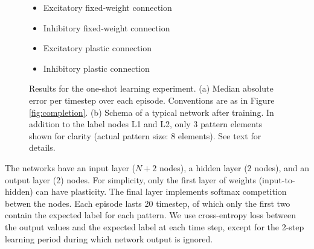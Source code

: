 \documentclass{article}
\begin{document}
\begin{figure}[b]
\begin{subfigure}[t]{0.4\textwidth}
\end{subfigure}
\begin{minipage}[b]{0.2\textwidth}
\noindent
\small
\begin{itemize}[leftmargin=*] %
\item[]\tikz{\path[very thick,->,draw=black] %
        (0,0) -- (1,0) ;}Excitatory fixed-weight connection
\item[]\tikz{\path[very thick,->,draw=blue] %
        (0,0) -- (1,0) ;}Inhibitory fixed-weight connection
\item[]\tikz{\path[very thick,->,dashed,draw=black] %
        (0,0) -- (1,0) ;}Excitatory plastic connection
\item[]\tikz{\path[very thick,->,dashed,draw=blue] %
        (0,0) -- (1,0) ;}Inhibitory plastic connection
\end{itemize}
\end{minipage}

\caption{Results for the one-shot learning experiment. (a) Median absolute error
    per timestep over each episode. Conventions are as in Figure
    \ref{fig:completion}.
(b) Schema of a
typical network after training. In addition to the label nodes L1 and L2, only 3 pattern elements shown for clarity (actual
pattern size: 8 elements). See text for details.}
\label{fig:oneshot}
\end{figure}

The networks have an input layer ($N+2$ nodes), a hidden layer (2 nodes), and an
output layer (2) nodes. For simplicity, only the first layer of weights
(input-to-hidden) can have plasticity. The final layer implements softmax
competition betwen the nodes. Each episode lasts 20 timestep, of which only the first
two contain the expected label for each pattern. We use cross-entropy loss
between the output values and the expected label at each time step, except for
the 2-step learning period during which network output is ignored.
\end{document}
